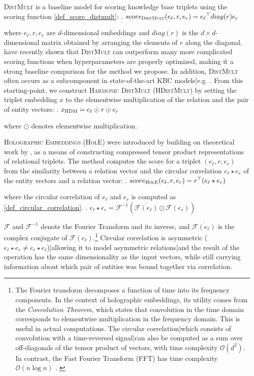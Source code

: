 \documentclass[a4paper,10pt]{article}
\begin{document}
\textsc{DistMult} \cite{yang2015distmult} is a baseline model for scoring knowledge base triplets using the scoring function \ref{def_score_distmult}:
\ex. $score_{\textsc{DistMult}}(e_\ell,r,e_r) = {e_\ell}^\top diag(r) {e_r}$ \label{def_score_distmult}

where $e_\ell, r, e_r$ are $d$-dimensional embeddings and $diag(r)$ is the $d\times d$-dimensional matrix obtained by arranging the elements of $r$ along the diagonal. \citet{kaldec2017baselines} have recently shown that \textsc{DistMult} can outperform many more complicated scoring functions when hyperparameters are properly optimized, making it a strong baseline comparison for the method we propose. In addition, \textsc{DistMult} often occurs as a subcomponent in state-of-the-art KBC models|e.g. \citep{schlichtkrull2017graphconv,toutanova2015jointembedding}. From this starting-point, we construct \textsc{Harmonic DistMult} (\textsc{HDistMult}) by setting the triplet embedding $x$ to the elementwise multiplication of the relation and the pair of entity vectors:
\ex. $x_{\textsc{HDM}} = e_\ell \odot r \odot e_r$ \label{def_x_hdistmult}

where $\odot$ denotes elementwise multiplication. 

\textsc{Holographic Embeddings} (\textsc{HolE}) were introduced by \citet{nickel2016hole} building on theoretical work by \cite{plate1995holographic}, as a means of constructing compressed tensor product representations of relational triplets. The method computes the score for a triplet $(e_\ell, r, e_r)$ from the similarity between a relation vector and the circular correlation $e_\ell \star e_r$ of the entity vectors and a relation vector: 
\ex. $score_{\textsc{HolE}}(e_\ell, r, e_r) = r^\top (e_\ell \star e_r)$ \label{def_score_HolE}

where the circular correlation of $e_\ell$ and $e_r$ is computed as \ref{def_circular_correlation}. 
\ex. $e_\ell \star e_r = \mathcal{F}^{-1}\left( \overline{\mathcal{F}(e_\ell)} \odot \mathcal{F}(e_r)\right)$ \label{def_circular_correlation}

$\mathcal{F}$ and $\mathcal{F}^{-1}$ denote the Fourier Transform and its inverse, and $\overline{\mathcal{F}(e_\ell)}$ is the complex conjugate of $\mathcal{F}(e_\ell)$.\footnote{The Fourier transform decomposes a function of time into its frequency components. In the context of holographic embeddings, its utility comes from the \emph{Convolution Theorem}, which states that convolution in the time domain corresponds to elementwise multiplication in the frequency domain. This is useful in actual computations. The circular correlation|which consists of convolution with a time-reversed signal|can also be computed as a sum over off-diagonals of the tensor product of vectors, with time complexity $\mathcal{O}(d^2)$. In contrast, the Fast Fourier Transform (FFT) has time complexity $\mathcal{O}(n\log n)$ \citep{nickel2016hole}.  \label{note_fourier}
}
 Circular correlation is asymmetric ($e_\ell \star e_r \not = e_r \star e_\ell$)|allowing it to model asymmetric relations|and the result of the operation has the same dimensionality as the input vectors, while still carrying information about which pair of entities was bound together via correlation. 
\end{document}
